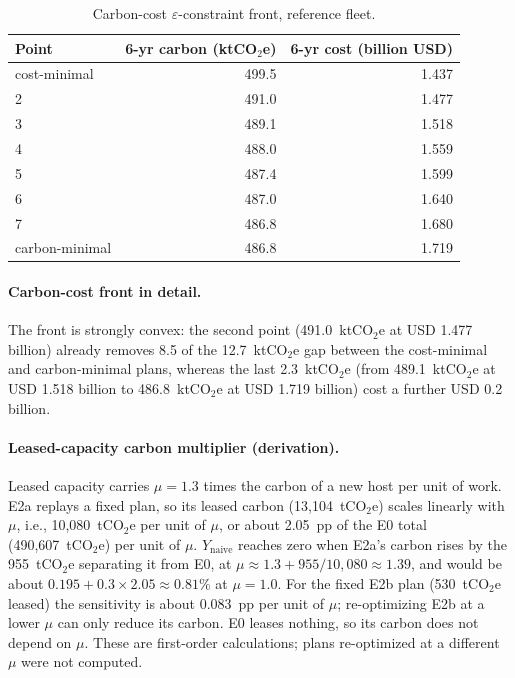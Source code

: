 \documentclass{article} %
\begin{document}
\begin{table}[h]
\caption{Carbon-cost $\varepsilon$-constraint front, reference fleet.}
\label{tab:pareto_app}
\begin{center}
\small
\begin{tabular}{lrr}
\toprule
Point & 6-yr carbon (ktCO$_2$e) & 6-yr cost (billion USD) \\
\midrule
cost-minimal & 499.5 & 1.437 \\
2 & 491.0 & 1.477 \\
3 & 489.1 & 1.518 \\
4 & 488.0 & 1.559 \\
5 & 487.4 & 1.599 \\
6 & 487.0 & 1.640 \\
7 & 486.8 & 1.680 \\
carbon-minimal & 486.8 & 1.719 \\
\bottomrule
\end{tabular}
\end{center}
\end{table}

\paragraph{Carbon-cost front in detail.} The front is strongly convex: the second point (491.0~ktCO$_2$e at USD 1.477 billion) already removes 8.5 of the 12.7~ktCO$_2$e gap between the cost-minimal and carbon-minimal plans, whereas the last 2.3~ktCO$_2$e (from 489.1~ktCO$_2$e at USD 1.518 billion to 486.8~ktCO$_2$e at USD 1.719 billion) cost a further USD 0.2 billion.

\paragraph{Leased-capacity carbon multiplier (derivation).} Leased capacity carries $\mu = 1.3$ times the carbon of a new host per unit of work. E2a replays a fixed plan, so its leased carbon (13,104~tCO$_2$e) scales linearly with $\mu$, i.e., 10,080~tCO$_2$e per unit of $\mu$, or about 2.05~pp of the E0 total (490,607~tCO$_2$e) per unit of $\mu$. $Y_{\text{naive}}$ reaches zero when E2a's carbon rises by the 955~tCO$_2$e separating it from E0, at $\mu \approx 1.3 + 955/10{,}080 \approx 1.39$, and would be about $0.195 + 0.3 \times 2.05 \approx 0.81\%$ at $\mu = 1.0$. For the fixed E2b plan (530~tCO$_2$e leased) the sensitivity is about 0.083~pp per unit of $\mu$; re-optimizing E2b at a lower $\mu$ can only reduce its carbon. E0 leases nothing, so its carbon does not depend on $\mu$. These are first-order calculations; plans re-optimized at a different $\mu$ were not computed.
\end{document}
